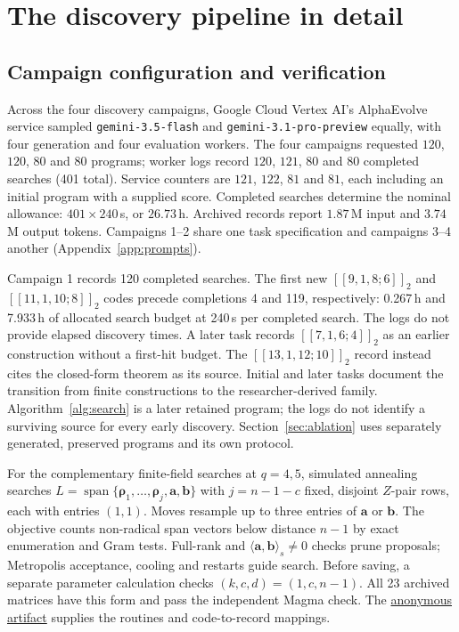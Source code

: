 \documentclass{article}
\newcommand{\artifactlink}{\href{https://anonymous.4open.science/r/llm_guided_EAQECC_search-4099}{anonymous artifact}}
\newcommand{\vct}[1]{\boldsymbol{#1}} %
\begin{document}
\section{The discovery pipeline in detail}\label{app:pipeline-detail}

\subsection{Campaign configuration and verification}\label{app:campaign}
Across the four discovery campaigns, Google Cloud Vertex AI's
AlphaEvolve service sampled
\texttt{gemini-3.5-flash} and \texttt{gemini-3.1-pro-preview} equally,
with four generation and four evaluation workers. The four campaigns
requested $120$, $120$, $80$ and $80$ programs; worker logs record
$120$, $121$, $80$ and $80$ completed searches (401 total). Service
counters are $121$, $122$, $81$ and $81$, each including an initial
program with a supplied score. Completed searches determine the nominal
allowance: $401\times240$\,s, or $26.73$\,h. Archived records report
$1.87$\,M input and $3.74$\,M output tokens. Campaigns 1--2 share one
task specification and campaigns 3--4 another (Appendix~\ref{app:prompts}).

Campaign 1 records 120 completed searches. The first new
$[[9,1,8;6]]_2$ and $[[11,1,10;8]]_2$ codes precede completions 4
and 119, respectively: 0.267\,h and 7.933\,h of allocated
search budget at 240\,s per completed search. The logs do not provide
elapsed discovery times. A later task records $[[7,1,6;4]]_2$ as an
earlier construction without a first-hit budget. The $[[13,1,12;10]]_2$
record instead cites the closed-form theorem as its source.
Initial and later tasks document the transition from finite constructions
to the researcher-derived family. Algorithm~\ref{alg:search} is a later
retained program; the logs do not identify a surviving source for every
early discovery. Section~\ref{sec:ablation} uses separately generated,
preserved programs and its own protocol.

For the complementary finite-field searches at $q=4,5$,
simulated annealing searches\label{app:nonbinary-search}
$L=\operatorname{span}\{\vct\rho_1,\ldots,\vct\rho_j,\vct a,\vct b\}$
with $j=n-1-c$ fixed, disjoint $Z$-pair rows, each with entries $(1,1)$.
Moves resample up to three entries of $\vct a$ or $\vct b$.
The objective counts non-radical span vectors below distance $n-1$ by
exact enumeration and Gram tests. Full-rank and
$\langle\vct a,\vct b\rangle_s\ne0$ checks prune proposals; Metropolis acceptance, cooling and restarts guide search.
Before saving, a separate parameter calculation checks $(k,c,d)=(1,c,n-1)$.
All 23 archived matrices have this form and pass the independent Magma
check. The \artifactlink{} supplies the routines and code-to-record mappings.
\end{document}
